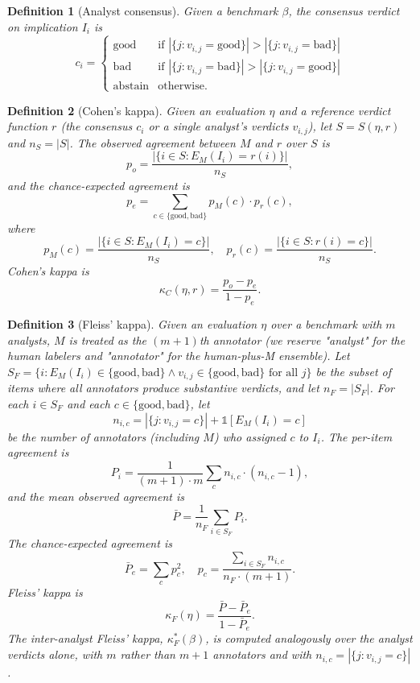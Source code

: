 \documentclass[11pt]{article}
\newtheorem{definition}{Definition}
\begin{document}
\begin{definition}[Analyst consensus]
Given a benchmark $\beta$, the consensus verdict on implication $I_i$ is
\[
c_i = \begin{cases}
\mathrm{good} & \text{if } |\{j : v_{i,j} = \mathrm{good}\}| > |\{j : v_{i,j} = \mathrm{bad}\}| \\
\mathrm{bad} & \text{if } |\{j : v_{i,j} = \mathrm{bad}\}| > |\{j : v_{i,j} = \mathrm{good}\}| \\
\mathrm{abstain} & \text{otherwise.}
\end{cases}
\]
\end{definition}

\begin{definition}[Cohen's kappa]
Given an evaluation $\eta$ and a reference verdict function $r$ (the consensus $c_i$ or a single analyst's verdicts $v_{i,j}$), let $S = S(\eta, r)$ and $n_S = |S|$. The observed agreement between $M$ and $r$ over $S$ is
\[
p_o = \frac{|\{i \in S : E_M(I_i) = r(i)\}|}{n_S},
\]
and the chance-expected agreement is
\[
p_e = \sum_{c \in \{\mathrm{good}, \mathrm{bad}\}} p_M(c) \cdot p_r(c),
\]
where
\[
p_M(c) = \frac{|\{i \in S : E_M(I_i) = c\}|}{n_S}, \quad p_r(c) = \frac{|\{i \in S : r(i) = c\}|}{n_S}.
\]
Cohen's kappa is
\[
\kappa_C(\eta, r) = \frac{p_o - p_e}{1 - p_e}.
\]
\end{definition}

\begin{definition}[Fleiss' kappa]
Given an evaluation $\eta$ over a benchmark with $m$ analysts, $M$ is treated as the $(m+1)$th annotator (we reserve "analyst" for the human labelers and "annotator" for the human-plus-M ensemble). Let $S_F = \{i : E_M(I_i) \in \{\mathrm{good}, \mathrm{bad}\} \wedge v_{i,j} \in \{\mathrm{good}, \mathrm{bad}\} \text{ for all } j\}$ be the subset of items where all annotators produce substantive verdicts, and let $n_F = |S_F|$. For each $i \in S_F$ and each $c \in \{\mathrm{good}, \mathrm{bad}\}$, let
\[
n_{i,c} = |\{j : v_{i,j} = c\}| + \mathbb{1}[E_M(I_i) = c]
\]
be the number of annotators (including $M$) who assigned $c$ to $I_i$. The per-item agreement is
\[
P_i = \frac{1}{(m+1) \cdot m} \sum_c n_{i,c} \cdot (n_{i,c} - 1),
\]
and the mean observed agreement is
\[
\bar{P} = \frac{1}{n_F} \sum_{i \in S_F} P_i.
\]
The chance-expected agreement is
\[
\bar{P}_e = \sum_c p_c^2, \quad p_c = \frac{\sum_{i \in S_F} n_{i,c}}{n_F \cdot (m+1)}.
\]
Fleiss' kappa is
\[
\kappa_F(\eta) = \frac{\bar{P} - \bar{P}_e}{1 - \bar{P}_e}.
\]
The inter-analyst Fleiss' kappa, $\kappa_F^*(\beta)$, is computed analogously over the analyst verdicts alone, with $m$ rather than $m+1$ annotators and with $n_{i,c} = |\{j : v_{i,j} = c\}|$.
\end{definition}
\end{document}
